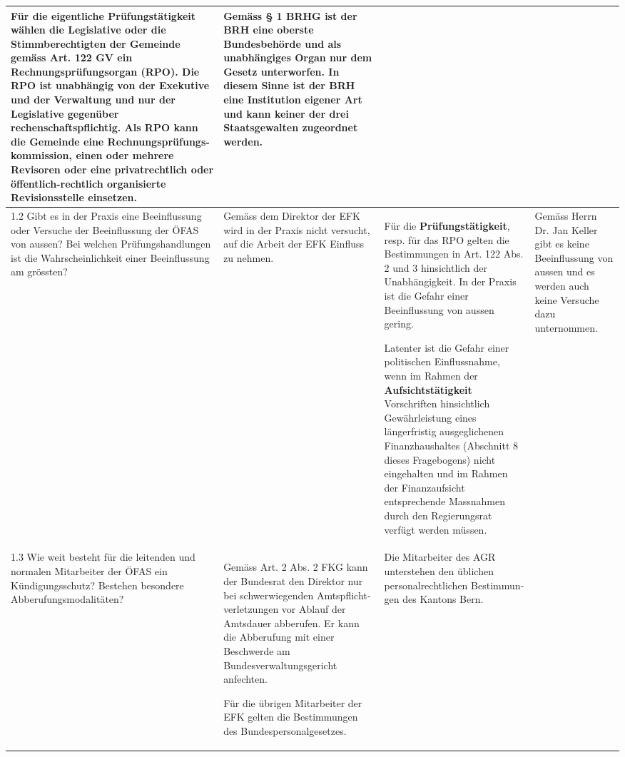 \documentclass[10pt]{article}
\begin{document}
\begin{landscape}
\begin{center}
\begin{longtable}{|p{4cm}|p{5cm}|p{7.5cm}|p{7.5cm}|}
Für die eigentliche \textbf{Prüfungs­tätigkeit} wählen die Legislative oder die Stimmberechtigten der Gemeinde gemäss Art. 122 GV ein Rechnungsprüfungsorgan (RPO). Die RPO ist unabhängig von der Exekutive und der Verwaltung und nur der Legislative gegenüber rechenschaftspflichtig. Als RPO kann die Gemeinde eine Rechnungs­prüfungs­kommission,  einen oder mehrere Revisoren oder eine privatrechtlich oder öffentlich-rechtlich organisierte Revisionsstelle einsetzen.

 & Gemäss § 1 BRHG ist der BRH eine oberste Bundesbehörde und als unabhängiges Organ nur dem Gesetz unterworfen. In diesem Sinne ist der BRH eine Institution eigener Art und kann keiner der drei Staatsgewalten zugeordnet werden.

 \\
\hline
1.2 Gibt es in der Praxis eine Beeinflussung oder Versuche der Beeinflussung der ÖFAS von aussen? Bei welchen Prüfungs­handlungen ist die Wahrscheinlichkeit einer Beeinflussung am grössten? & Gemäss dem Direktor der EFK wird in der Praxis nicht versucht, auf die Arbeit der EFK Einfluss zu nehmen.  & Für die \textbf{Prüfungstätigkeit}, resp. für das RPO gelten die Bestimmungen in Art. 122 Abs. 2 und 3 hinsichtlich der Unabhängigkeit. In der Praxis ist die Gefahr einer Beeinflussung von aussen gering.

Latenter ist die Gefahr einer politischen Einflussnahme, wenn im Rahmen der \textbf{Aufsichtstätigkeit} Vorschriften hinsichtlich Gewährleistung eines längerfristig ausgeglichenen Finanzhaushaltes (Abschnitt 8 dieses Fragebogens) nicht eingehalten und im Rahmen der Finanzaufsicht entsprechende Massnahmen durch den Regierungsrat verfügt werden müssen.

 & Gemäss Herrn Dr. Jan Keller gibt es keine Beeinflussung von aussen und es werden auch keine Versuche dazu unternommen.

 \\
\hline
1.3 Wie weit besteht für die leitenden und normalen Mitarbeiter der ÖFAS ein Kündigungsschutz? Bestehen besondere Abberufungsmodalitäten? & Gemäss Art. 2 Abs. 2 FKG kann der Bundesrat den Direktor nur bei schwerwiegenden Amtspflicht­verletzungen vor Ablauf der Amtsdauer abberufen. Er kann die Abberufung mit einer Beschwerde am Bundesverwaltungsgericht anfechten.

Für die übrigen Mitarbeiter der EFK gelten die Bestimmungen des Bundespersonalgesetzes.

 & Die Mitarbeiter des AGR unterstehen den üblichen personalrechtlichen Bestimmun­gen des Kantons Bern.


\end{longtable}
\end{center}
\end{landscape}
\end{document}
